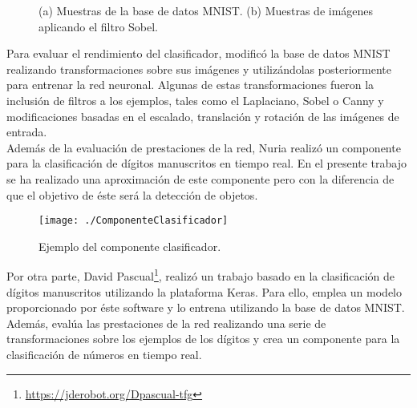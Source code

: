\documentclass[a4paper, 12pt, oneside]{book}
\begin{document}
\begin{figure}[H]
\begin{center}
\caption{(a) Muestras de la base de datos MNIST. (b) Muestras de imágenes aplicando el filtro Sobel.}
\label{MNIST}
\end{center}
\end{figure}

Para evaluar el rendimiento del clasificador, modificó la base de datos MNIST realizando transformaciones sobre sus imágenes y utilizándolas posteriormente para entrenar la red neuronal. Algunas de estas transformaciones fueron la inclusión de filtros a los ejemplos, tales como el Laplaciano, Sobel o Canny y modificaciones basadas en el escalado, translación y rotación de las imágenes de entrada.\\

Además de la evaluación de prestaciones de la red, Nuria realizó un componente para la clasificación de dígitos manuscritos en tiempo real. En el presente trabajo se ha realizado una aproximación de este componente pero con la diferencia de que el objetivo de éste será la detección de objetos.

\begin{figure}[H]
\begin{center}
\texttt{[image: ./ComponenteClasificador]}
\caption{Ejemplo del componente clasificador.}
\label{ComponenteClasificador}
\end{center}
\end{figure}

\begin{comment}
Finalmente, Nuria proporciona la información necesaria para abordar el problema de la detección con Caffe. Muestra algunas pruebas realizadas para la mejor compresión de este proceso. El actual trabajo se centrará en la tarea de detección apoyándose en este primer paso dado por Nuria.\\
\end{comment}

Por otra parte, David Pascual\footnote{\url{https://jderobot.org/Dpascual-tfg}}, realizó un trabajo basado en la clasificación de dígitos manuscritos utilizando la plataforma Keras. Para ello, emplea un modelo proporcionado por éste software y lo entrena utilizando la base de datos MNIST. Además, evalúa las prestaciones de la red realizando una serie de transformaciones sobre los ejemplos de los dígitos y crea un componente para la clasificación de números en tiempo real.\\
\end{document}
